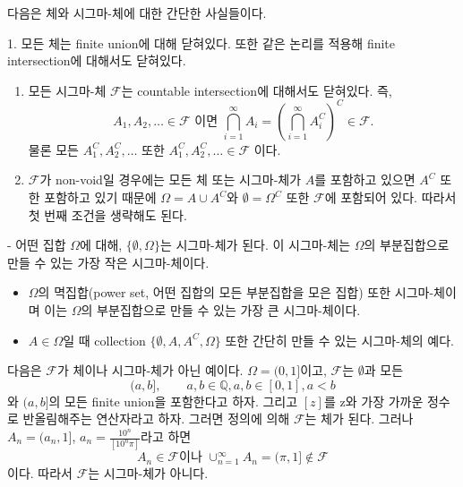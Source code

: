 \documentclass[b5paper,]{scrbook}
\theoremstyle{plain}
\theoremstyle{definition}
\numberwithin{equation}{section}
\let\BeginKnitrBlock\begin \let\EndKnitrBlock\end
\begin{document}
다음은 체와 시그마-체에 대한 간단한 사실들이다.

\BeginKnitrBlock{corollary}[시그마-체에 대한 사실들]
\protect\hypertarget{cor:unnamed-chunk-35}{}{\label{cor:unnamed-chunk-35}
{} }1. 모든 체는 finite union에
대해 닫혀있다. 또한 같은 논리를 적용해 finite intersection에 대해서도
닫혀있다.

\begin{enumerate}
\def\labelenumi{\arabic{enumi}.}
\setcounter{enumi}{1}
\item
  모든 시그마-체 \(\mathcal{F}\)는 countable intersection에 대해서도
  닫혀있다. 즉,
  \[A_{1}, A_{2}, \ldots  \in \mathcal{F} \text{ 이면 }  \bigcap_{i=1}^{\infty}A_{i} = (\bigcap_{i=1}^{\infty}A_{i}^{C})^{C} \in \mathcal{F}.\]
  물론 모든 \(A_{1}^{C}, A_{2}^{C},\ldots\) 또한
  \(A_{1}^{C}, A_{2}^{C}, \ldots \in \mathcal{F}\) 이다.
\item
  \(\mathcal{F}\)가 non-void일 경우에는 모든 체 또는 시그마-체가 \(A\)를
  포함하고 있으면 \(A^{C}\) 또한 포함하고 있기 때문에
  \(\Omega=A \cup A^{C}\)와 \(\emptyset=\Omega^{C}\) 또한
  \(\mathcal{F}\)에 포함되어 있다. 따라서 첫 번째 조건을 생략해도 된다.
\end{enumerate}
\EndKnitrBlock{corollary}

\BeginKnitrBlock{example}[시그마-체의 예]
\protect\hypertarget{exm:unnamed-chunk-36}{}{\label{exm:unnamed-chunk-36}
{} }- 어떤 집합 \(\Omega\)에 대해,
\(\{\emptyset, \Omega\}\)는 시그마-체가 된다. 이 시그마-체는
\(\Omega\)의 부분집합으로 만들 수 있는 가장 작은 시그마-체이다.

\begin{itemize}
\item
  \(\Omega\)의 멱집합(power set, 어떤 집합의 모든 부분집합을 모은 집합)
  또한 시그마-체이며 이는 \(\Omega\)의 부분집합으로 만들 수 있는 가장 큰
  시그마-체이다.
\item
  \(A\in\Omega\)일 때 collection \(\{\emptyset, A, A^{C}, \Omega\}\)
  또한 간단히 만들 수 있는 시그마-체의 예다.
\end{itemize}
\EndKnitrBlock{example}

\BeginKnitrBlock{example}[체이나 시그마-체가 아닌 예]
\protect\hypertarget{exm:unnamed-chunk-37}{}{\label{exm:unnamed-chunk-37}
{} }다음은 \(\mathcal{F}\)가
체이나 시그마-체가 아닌 예이다. \(\Omega=(0,1]\)이고, \(\mathcal{F}\)는
\(\emptyset\)과 모든
\[(a,b], \qquad{a,b\in\mathbb{Q}, a,b\in [0,1], a<b}\] 와 \((a,b]\)의
모든 finite union을 포함한다고 하자. 그리고 \([z]\)를 z와 가장 가까운
정수로 반올림해주는 연산자라고 하자. 그러면 정의에 의해
\(\mathcal{F}\)는 체가 된다. 그러나 \(A_{n}=(a_{n},1]\),
\(a_{n}=\frac{10^{n}}{[10^{n}\pi]}\)라고 하면
\[A_{n}\in\mathcal{F} \text{이나 } \cup_{n=1}^{\infty}A_{n}=(\pi,1]\notin \mathcal{F}\]
이다. 따라서 \(\mathcal{F}\)는 시그마-체가 아니다.
\EndKnitrBlock{example}
\end{document}

